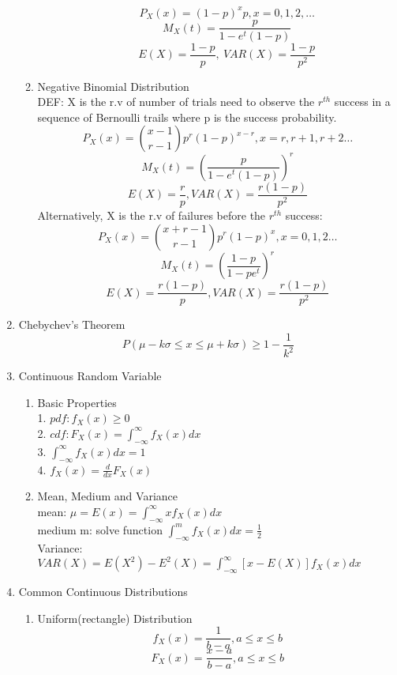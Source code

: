 \documentclass[10pt]{article}
\begin{document}
\begin{multicols}{2}
\begin{enumerate}
\begin{enumerate}
\begin{enumerate}
					$$ P_X(x) = (1-p)^xp, x = 0,1,2,\dots $$
					$$M_X(t) = \frac{p}{1-e^t(1-p)}$$
					$$E(X) = \frac{1-p}{p}, \ VAR(X) = \frac{1-p}{p^2}$$
				\end{enumerate}
				\item Negative Binomial Distribution\\
					DEF: X is the r.v of number of trials need to observe the $r^{th}$ success in a sequence of Bernoulli trails where p is the success probability.\\
					$$P_X(x) = {x-1 \choose r-1}p^r(1-p)^{x-r}, x = r,r+1,r+2 \dots$$
					$$M_X(t) = (\frac{p}{1-e^t(1-p)})^r$$
					$$E(X) = \frac{r}{p}, VAR(X) = \frac{r(1-p)}{p^2}$$
					Alternatively, X is the r.v of failures before the $r^{th}$ success:\\
					$$P_X(x) = {x+r-1 \choose r-1}p^r(1-p)^x, x = 0,1,2 \dots$$
					$$M_X(t) = (\frac{1-p}{1-pe^t})^r$$
					$$E(X) = \frac{r(1-p)}{p}, VAR(X) = \frac{r(1-p)}{p^2}$$
			\end{enumerate}
			\item Chebychev's Theorem\\
			$$P(\mu-k\sigma \le x \le \mu+k\sigma) \ge 1-\frac{1}{k^2}$$
			\item Continuous Random Variable
			\begin{enumerate}
				\item Basic Properties\\
				1. $pdf: f_X(x) \ge 0$\\
				2. $cdf: F_X(x) = \int_{-\infty}^{\infty} f_X(x)dx$\\
				3. $\int_{-\infty}^{\infty}f_X(x)dx = 1$\\
				4. $f_X(x) = \frac{d}{dx}F_X(x)$
				\item Mean, Medium and Variance\\
				mean: $\mu = E(x) = \int_{-\infty}^{\infty}xf_X(x)dx$\\
				medium m: solve function $\int_{-\infty}^{m} f_X(x)dx = \frac{1}{2}$\\
				Variance: \\
				$VAR(X) = E(X^2) - E^2(X) = \int_{-\infty}^{\infty}[x-E(X)]f_X(x)dx$
			\end{enumerate}
			\item Common Continuous Distributions
			\begin{enumerate}
				\item Uniform(rectangle) Distribution\\
				$$f_X(x) = \frac{1}{b-a}, a \le x \le b$$
				$$F_X(x) = \frac{x-a}{b-a}, a\le x \le b$$

\end{enumerate}
\end{enumerate}
\end{multicols}
\end{document}
